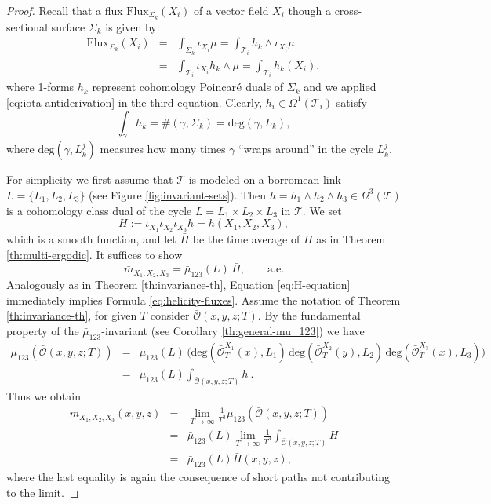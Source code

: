 \documentclass[12pt]{article}
\begin{document}
\begin{proof}
 Recall that a flux $\text{Flux}_{\Sigma_k}(X_i)$ of a vector field $X_i$ though a cross-sectional surface
 $\Sigma_k$ is given by:
 \begin{eqnarray*}
  \text{Flux}_{\Sigma_k}(X_i) & = & \int_{\Sigma_k} \iota_{X_i}\mu=\int_{\mathcal{T}_i} h_k\wedge\iota_{X_i}\mu\\
  & = & \int_{\mathcal{T}_i} \iota_{X_i}h_k\wedge\mu =\int_{\mathcal{T}_i} h_k(X_i),
 \end{eqnarray*}
 where 1-forms $h_k$ represent cohomology Poincar$\acute{\rm e}$ duals of $\Sigma_k$ and we applied \eqref{eq:iota-antiderivation} in the third equation. Clearly, $h_i\in \Omega^1(\mathcal{T}_i)$ satisfy 
 \[
  \int_{\gamma} h_k=\#(\gamma,\Sigma_k)=\text{deg}(\gamma, L_k),
 \]
 where $\text{deg}(\gamma, L^j_k)$ measures how many times $\gamma$ ``wraps around'' in the cycle  $L^j_k$. 
 
 For simplicity we first assume that $\mathcal{T}$ is modeled on a borromean link
 $L=\{L_1,L_2,L_3\}$ (see Figure \ref{fig:invariant-sets}). Then $h=h_1\wedge h_2\wedge h_3\in \Omega^3(\mathcal{T})$  is a cohomology class dual of the cycle $L=L_1\times L_2\times L_3$ in $\mathcal{T}$. We set
 \[
  H:=\iota_{X_1}\iota_{X_2}\iota_{X_3} h=h(X_1,X_2,X_3),
 \]
 which is a smooth function, and let $\bar{H}$ be the time average of $H$ as in Theorem \ref{th:multi-ergodic}. It suffices to show 
 \begin{equation}\label{eq:H-equation}
   \bar{m}_{X_1,X_2,X_3}=\bar{\mu}_{123}(L)\,\bar{H},\qquad \text{a.e.}
 \end{equation}
  Analogously as in Theorem \ref{th:invariance-th}, 
 Equation \eqref{eq:H-equation} immediately implies Formula \eqref{eq:helicity-fluxes}. 
 Assume the notation of Theorem \ref{th:invariance-th}, for given $T$ consider $\bar{\mathscr{O}}(x,y,z;T)$. 
 By the fundamental property of the $\bar{\mu}_{123}$-invariant (see Corollary \ref{th:general-mu_123}) we have 
 \begin{eqnarray*}
  \bar{\mu}_{123}(\bar{\mathscr{O}}(x,y,z;T)) & = & \bar{\mu}_{123}(L)\,\bigl(\text{deg}(\bar{\mathscr{O}}^{X_1}_T(x),L_1)\,\text{deg}(\bar{\mathscr{O}}^{X_2}_T(y),L_2)\,\text{deg}(\bar{\mathscr{O}}^{X_3}_T(x),L_3)\bigr)\\
  & = & \bar{\mu}_{123}(L)\int_{\bar{\mathscr{O}}(x,y,z;T)} h\ .
 \end{eqnarray*}
Thus we obtain 
 \begin{eqnarray*}
  \bar{m}_{X_1,X_2, X_3}(x,y,z) & = & \lim_{T\to \infty} \frac{1}{T^3}\bar{\mu}_{123}(\bar{\mathscr{O}}(x,y,z;T))\\
  & = & \bar{\mu}_{123}(L)\lim_{T\to \infty} \frac{1}{T^3}\int_{\bar{\mathscr{O}}(x,y,z;T)} H\\
  & =  &\bar{\mu}_{123}(L) \bar{H}(x,y,z),
 \end{eqnarray*}
where the last equality is again the consequence of short paths not contributing to the limit.


\end{proof}
\end{document}
